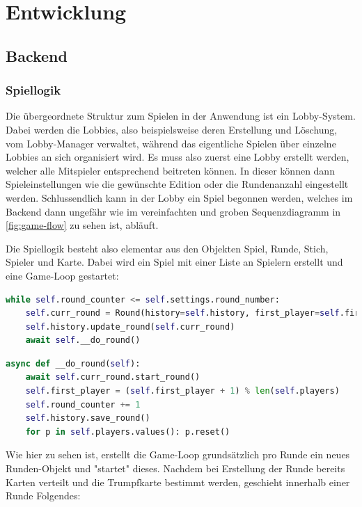 \chapter{Entwicklung}

\section{Backend}

\subsection{Spiellogik}

Die übergeordnete Struktur zum Spielen in der Anwendung ist ein Lobby-System. Dabei werden die Lobbies, also beispielsweise deren Erstellung und Löschung, vom Lobby-Manager verwaltet, während das eigentliche Spielen über einzelne Lobbies an sich organisiert wird. Es muss also zuerst eine Lobby erstellt werden, welcher alle Mitspieler entsprechend beitreten können. In dieser können dann Spieleinstellungen wie die gewünschte Edition oder die Rundenanzahl eingestellt werden. Schlussendlich kann in der Lobby ein Spiel begonnen werden, welches im Backend dann ungefähr wie im vereinfachten und groben Sequenzdiagramm in \cref{fig:game-flow} zu sehen ist, abläuft.

Die Spiellogik besteht also elementar aus den Objekten Spiel, Runde, Stich, Spieler und Karte. Dabei wird ein Spiel mit einer Liste an Spielern erstellt und eine Game-Loop gestartet:

\begin{lstlisting}[language=Python]
while self.round_counter <= self.settings.round_number:
	self.curr_round = Round(history=self.history, first_player=self.first_player, round_counter=self.round_counter)
	self.history.update_round(self.curr_round)
	await self.__do_round()
\end{lstlisting}

\begin{lstlisting}[language=Python]
async def __do_round(self):
	await self.curr_round.start_round()
	self.first_player = (self.first_player + 1) % len(self.players)
	self.round_counter += 1
	self.history.save_round()
	for p in self.players.values(): p.reset()
\end{lstlisting}

Wie hier zu sehen ist, erstellt die Game-Loop grundsätzlich pro Runde ein neues Runden-Objekt und "startet" dieses. Nachdem bei Erstellung der Runde bereits Karten verteilt und die Trumpfkarte bestimmt werden, geschieht innerhalb einer Runde Folgendes:

